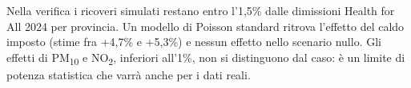 Nella verifica i ricoveri simulati restano entro l'1,5\% dalle dimissioni Health for All 2024 per provincia. Un modello di Poisson standard ritrova l'effetto del caldo imposto (stime fra +4,7\% e +5,3\%) e nessun effetto nello scenario nullo. Gli effetti di PM\textsubscript{10} e NO\textsubscript{2}, inferiori all'1\%, non si distinguono dal caso: è un limite di potenza statistica che varrà anche per i dati reali.
